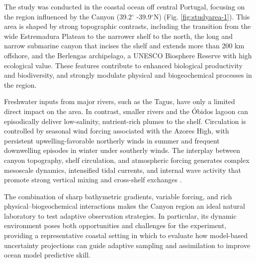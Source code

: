 The study was conducted in the coastal ocean off central Portugal,
focusing on the region influenced by the \naz Canyon (39.2$^{\circ}$
-39.9$^{\circ}$N) (Fig. \ref{fig:studyarea-1}). This area is shaped by
strong topographic contrasts, including the transition from the wide
Estremadura Plateau to the narrower shelf to the north, the long and
narrow \naz submarine canyon that incises the shelf and extends more
than 200 km offshore, and the Berlengas archipelago, a UNESCO
Biosphere Reserve with high ecological value. These features
contribute to enhanced biological productivity and biodiversity, and
strongly modulate physical and biogeochemical processes in the region.

Freshwater inputs from major rivers, such as the Tagus, have only a
limited direct impact on the area. In contrast, smaller rivers and the
\'{O}bidos lagoon can episodically deliver low-salinity, nutrient-rich
plumes to the shelf. Circulation is controlled by seasonal wind forcing
associated with the Azores High, with persistent upwelling-favorable
northerly winds in summer and frequent downwelling episodes in winter
under southerly winds. The interplay between canyon topography, shelf
circulation, and atmospheric forcing generates complex mesoscale
dynamics, intensified tidal currents, and internal wave activity that
promote strong vertical mixing and cross-shelf exchanges
\cite{martins10,quaresma07}.

The combination of sharp bathymetric gradients, variable forcing, and
rich physical–biogeochemical interactions makes the \naz Canyon region
an ideal natural laboratory to test adaptive observation strategies. In
particular, its dynamic environment poses both opportunities and
challenges for the \proj experiment, providing a representative coastal
setting in which to evaluate how model-based uncertainty projections can
guide adaptive sampling and assimilation to improve ocean model
predictive skill.

